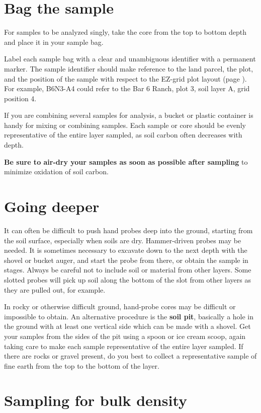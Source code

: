 \documentclass[11pt,letterpaper,oneside,onecolumn]{memoir}
\begin{document}
\section{Bag the sample}

For samples to be analyzed singly, take the core from the top to bottom depth and place it in your sample bag.

Label each sample bag with a clear and unambiguous identifier with a permanent marker. The sample identifier should make reference to the land parcel, the plot, and the position of the sample with respect to the EZ-grid plot layout (page \pageref{EZgrid}). For example, B6N3-A4 could refer to the Bar 6 Ranch, plot 3, soil layer A, grid position 4.

If you are combining several samples for analysis, a bucket or plastic container is handy for mixing or combining samples. Each sample or core should be evenly representative of the entire layer sampled, as soil carbon often decreases with depth.

\textbf{Be sure to air-dry your samples as soon as possible after sampling} to minimize oxidation of soil carbon.


\section{Going deeper}

It can often be difficult to push hand probes deep into the ground, starting from the soil surface, especially when soils are dry. Hammer-driven probes may be needed. It is sometimes necessary to excavate down to the next depth with the shovel or bucket auger, and start the probe from there, or obtain the sample in stages. Always be careful not to include soil or material from other layers. Some slotted probes will pick up soil along the bottom of the slot from other layers as they are pulled out, for example.

In rocky or otherwise difficult ground, hand-probe cores may be difficult or impossible to obtain. An alternative procedure is the \textbf{soil pit}, basically a hole in the ground with at least one vertical side which can be made with a shovel. Get your samples from the sides of the pit using a spoon or ice cream scoop, again taking care to make each sample representative of the entire layer sampled. If there are rocks or gravel present, do you best to collect a representative sample of fine earth from the top to the bottom of the layer.

\section{Sampling for bulk density}
\end{document}
